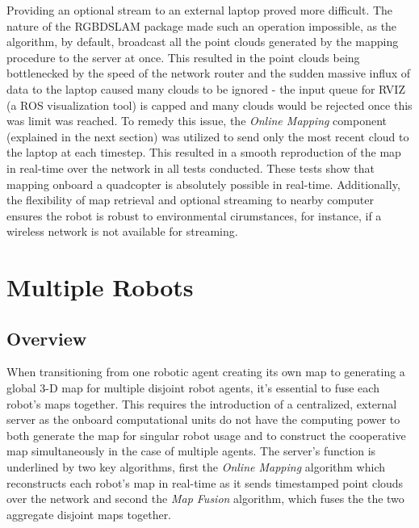 \documentclass[letterpaper, oneside, 10pt]{report}
\begin{document}
\noindent Providing an optional stream to an external laptop proved more difficult. The nature of the RGBDSLAM package made such an operation impossible, as the algorithm, by default, broadcast all the point clouds generated by the mapping procedure to the server at once. This resulted in the point clouds being bottlenecked by the speed of the network router and the sudden massive influx of data to the laptop caused many clouds to be ignored - the input queue for RVIZ (a ROS visualization tool) is capped and many clouds would be rejected once this was limit was reached. To remedy this issue, the \textsl{Online Mapping} component (explained in the next section) was utilized to send only the most recent cloud to the laptop at each timestep. This resulted in a smooth reproduction of the map in real-time over the network in all tests conducted. These tests show that mapping onboard a quadcopter is absolutely possible in real-time. Additionally, the flexibility of map retrieval and optional streaming to nearby computer ensures the robot is robust to environmental cirumstances, for instance, if a wireless network is not available for streaming.

\chapter{Multiple Robots}

\section{Overview}

When transitioning from one robotic agent creating its own map to generating a global 3-D map for multiple disjoint robot agents, it's essential to fuse each robot's maps together. This requires the introduction of a centralized, external server as the onboard computational units do not have the computing power to both generate the map for singular robot usage and to construct the cooperative map simultaneously in the case of multiple agents. The server's function is underlined by two key algorithms, first the \textsl{Online Mapping} algorithm which reconstructs each robot's map in real-time as it sends timestamped point clouds over the network and second the \textsl{Map Fusion} algorithm, which fuses the the two aggregate disjoint maps together.
\end{document}
